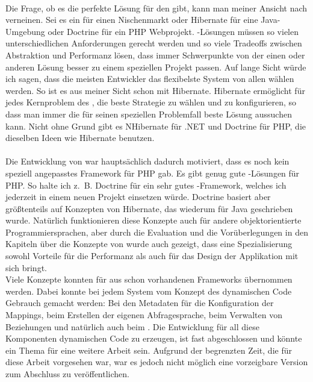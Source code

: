 \\
Die Frage, ob es die perfekte Lösung für den \IMfull gibt, kann man meiner Ansicht nach verneinen. Sei es ein \OODBMS für einen Nischenmarkt oder Hibernate für eine Java-Umgebung oder Doctrine für ein PHP Webprojekt. \ORM-Lösungen müssen so vielen unterschiedlichen Anforderungen gerecht werden und so viele Tradeoffs zwischen Abstraktion und Performanz lösen, dass immer Schwerpunkte von der einen oder anderen Lösung besser zu einem speziellen Projekt passen. Auf lange Sicht würde ich sagen, dass die meisten Entwickler das flexibelste System von allen wählen werden. So ist es aus meiner Sicht schon mit Hibernate. Hibernate ermöglicht für jedes Kernproblem des \IM, die beste Strategie zu wählen und zu konfigurieren, so dass man immer die für seinen speziellen Problemfall beste Lösung aussuchen kann. Nicht ohne Grund gibt es NHibernate für .NET und Doctrine für PHP, die dieselben Ideen wie Hibernate benutzen. \\
\\
Die Entwicklung von \PSCORM war hauptsächlich dadurch motiviert, dass es noch kein speziell angepasstes Framework für PHP gab. Es gibt genug gute \ORM-Lösungen für PHP. So halte ich z.~B. Doctrine für ein sehr gutes \ORM-Framework, welches ich jederzeit in einem neuen Projekt einsetzen würde. Doctrine basiert aber größtenteils auf Konzepten von Hibernate, das wiederum für Java geschrieben wurde. Natürlich funktionieren diese Konzepte auch für andere objektorientierte Programmiersprachen, aber durch die Evaluation und die Vorüberlegungen in den Kapiteln über die Konzepte von \PSCORM wurde auch gezeigt, dass eine Spezialisierung sowohl Vorteile für die Performanz als auch für das Design der Applikation mit sich bringt. \\
Viele Konzepte konnten für \PSCORM aus schon vorhandenen Frameworks übernommen werden. Dabei konnte bei jedem System vom Konzept des dynamischen Code Gebrauch gemacht werden: Bei den Metadaten für die Konfiguration der Mappings, beim Erstellen der eigenen Abfragesprache, beim Verwalten von Beziehungen und natürlich auch beim . Die Entwicklung für all diese Komponenten dynamischen Code zu erzeugen, ist fast abgeschlossen und könnte ein Thema für eine weitere Arbeit sein. Aufgrund der begrenzten Zeit, die für diese Arbeit vorgesehen war, war es jedoch nicht möglich eine vorzeigbare Version zum Abschluss zu veröffentlichen.\\
\\
